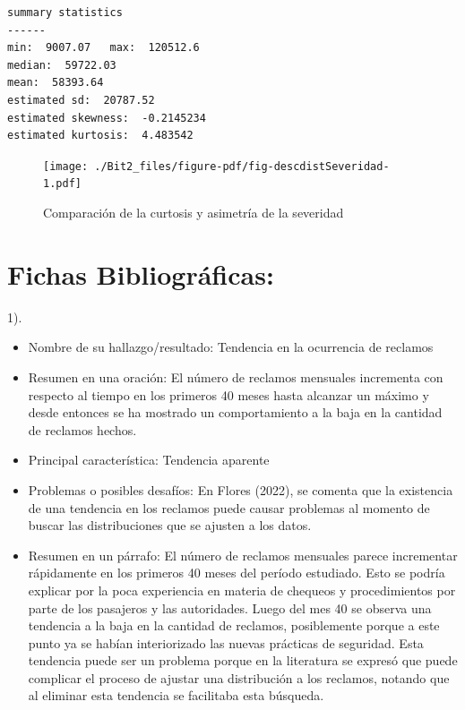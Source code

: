 \documentclass[
  letterpaper,
  onepage,
  openany]{scrreprt}
\begin{document}
\begin{verbatim}
summary statistics
------
min:  9007.07   max:  120512.6 
median:  59722.03 
mean:  58393.64 
estimated sd:  20787.52 
estimated skewness:  -0.2145234 
estimated kurtosis:  4.483542 
\end{verbatim}

\begin{figure}[H]

\caption{\label{fig-descdistSeveridad}Comparación de la curtosis y
asimetría de la severidad}

{\centering \texttt{[image: ./Bit2\_files/figure-pdf/fig-descdistSeveridad-1.pdf]}

}

\end{figure}

\hypertarget{fichas-bibliogruxe1ficas}{%
\section{Fichas Bibliográficas:}\label{fichas-bibliogruxe1ficas}}

1).

\begin{itemize}
\item
  Nombre de su hallazgo/resultado: Tendencia en la ocurrencia de
  reclamos
\item
  Resumen en una oración: El número de reclamos mensuales incrementa con
  respecto al tiempo en los primeros 40 meses hasta alcanzar un máximo y
  desde entonces se ha mostrado un comportamiento a la baja en la
  cantidad de reclamos hechos.
\item
  Principal característica: Tendencia aparente
\item
  Problemas o posibles desafíos: En Flores (2022), se comenta que la
  existencia de una tendencia en los reclamos puede causar problemas al
  momento de buscar las distribuciones que se ajusten a los datos.
\item
  Resumen en un párrafo: El número de reclamos mensuales parece
  incrementar rápidamente en los primeros 40 meses del período
  estudiado. Esto se podría explicar por la poca experiencia en materia
  de chequeos y procedimientos por parte de los pasajeros y las
  autoridades. Luego del mes 40 se observa una tendencia a la baja en la
  cantidad de reclamos, posiblemente porque a este punto ya se habían
  interiorizado las nuevas prácticas de seguridad. Esta tendencia puede
  ser un problema porque en la literatura se expresó que puede complicar
  el proceso de ajustar una distribución a los reclamos, notando que al
  eliminar esta tendencia se facilitaba esta búsqueda.
\end{itemize}
\end{document}
